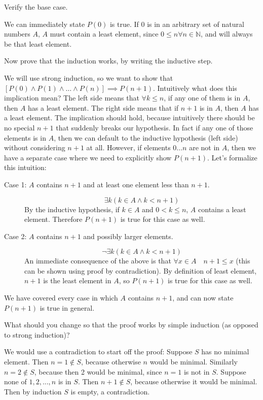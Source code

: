 \begin{questions}
\item Verify the base case.
\begin{solution}[.7 in]
We can immediately state $P(0)$ is true. If $0$ is in an arbitrary set 
of natural numbers $A$, $A$ must contain a least element, since $0 
\leq n \forall n \in \mathbb{N}$, and will always be that least element.
\end{solution}

\item Now prove that the induction works, by writing the inductive step. 
\begin{solution}[2in]
We will use strong induction, so we want to show that $[P(0) \land P(1) 
\land \ldots \land P(n)] \implies P(n+1)$. Intuitively what does this 
implication mean? The left side means that $\forall k \leq n$, if any 
one of them is in $A$, then $A$ has a least element. The right side 
means that if $n+1$ is in $A$, then $A$ has a least element. The 
implication should hold, because intuitively there should be no special 
$n+1$ that suddenly breaks our hypothesis. In fact if any one of those 
elements is in $A$, then we can default to the inductive hypothesis 
(left side) without considering $n+1$ at all. However, if elements $0 
\ldots n$ are not in $A$, then we have a separate case where we need 
to explicitly show $P(n+1)$. Let's formalize this intuition:
\begin{description}
\item[Case 1: $A$ contains $n+1$ and at least one element less than $n+1$.]
$$
\exists k (k \in A \land k < n+1)
$$
By the inductive hypothesis, if $k \in A$ and $0 < k \leq n$, $A$ 
contains a least element. Therefore $P(n+1)$ is true for this case as well.
\item[Case 2: $A$ contains $n+1$ and possibly larger elements.] 
$$
\lnot \exists k (k \in A \land k < n+1)
$$
An immediate consequence of the above is that $\forall x \in A\quad n+1 
\leq x$ (this can be shown using proof by contradiction). By definition 
of least element, $n+1$ is the least element in $A$, so $P(n+1)$ is true 
for this case as well.
\end{description}
We have covered every case in which $A$ contains $n+1$, and can now 
state $P(n+1)$ is true in general.
\end{solution}

\item What should you change so that the proof works by simple 
induction (as opposed to strong induction)?
\begin{solution}
We would use a contradiction to start off the proof: Suppose $S$ has 
no minimal element. Then $n=1 \not \in S$, because otherwise $n$ would 
be minimal. Similarly $n=2 \not \in S$, because then 2 would be minimal, 
since $n=1$ is not in $S$. Suppose none of $1,2,...,n$ is in $S$. Then 
$n+1\not \in S$, because otherwise it would be minimal. Then by induction 
$S$ is empty, a contradiction.
\end{solution}
\end{questions}